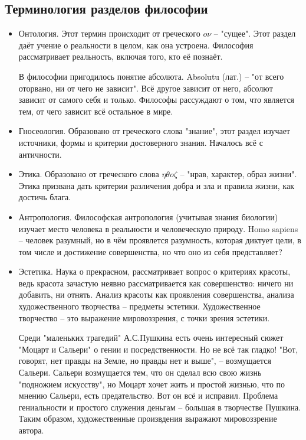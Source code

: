 \documentclass[a4paper, 12pt]{book} %
\begin{document}
\subsection{Терминология разделов философии}
\begin{itemize}
\item Онтология.
Этот термин происходит от греческого $o \nu$ -- "сущее". Этот раздел даёт учение о реальности в целом, как она устроена. Философия рассматривает реальность, включая того, кто её познаёт.
 
В философии пригодилось понятие абсолюта. Absolutu (лат.) -- "от всего оторвано, ни от чего не зависит". Всё другое зависит от него, абсолют зависит от самого себя и  только. Философы рассуждают о том, что является тем, от чего зависит всё остальное в мире.

\item Гносеология. Образовано от греческого слова "знание", этот раздел изучает источники, формы и критерии достоверного знания. Началось всё с античности. 

\item Этика. Образовано от греческого слова $\eta \theta o \zeta$ -- "нрав, характер, образ жизни". Этика призвана дать критерии различения добра и зла и правила жизни, как достичь блага.

\item Антропология. Философская антропология (учитывая знания биологии) изучает место человека в реальности и человеческую природу. Homo sapiens -- человек разумный, но в чём проявлется разумность, которая диктует цели, в том числе и достижение совершенства, но что оно из себя представляет?

\item Эстетика. Наука о прекрасном, рассматривает вопрос о критериях красоты, ведь красота зачастую неявно рассматривается как совершенство: ничего ни добавить, ни отнять. Анализ красоты как проявления совершенства, анализа художественного творчества -- предметы эстетики. Художественное творчество -- это выражение мировоззрения, с точки зрения эстетики. 	

Среди "маленьких трагедий" А.С.Пушкина есть очень интересный сюжет "Моцарт и Сальери" о гении и посредственности. Но не всё так гладко! "Вот, говорят, нет правды на Земле,  но правды нет и выше", -- возмущается Сальери. Сальери возмущается тем, что он сделал всю свою жизнь "подножием искусству", но Моцарт хочет жить и простой жизнью, что по мнению Сальери, есть предательство. Вот он всё и исправил. Проблема гениальности и простого служения деньгам -- большая в творчестве Пушкина. Таким образом, художественные произвдения выражают мировоззрение автора.


\end{itemize}
\end{document}
